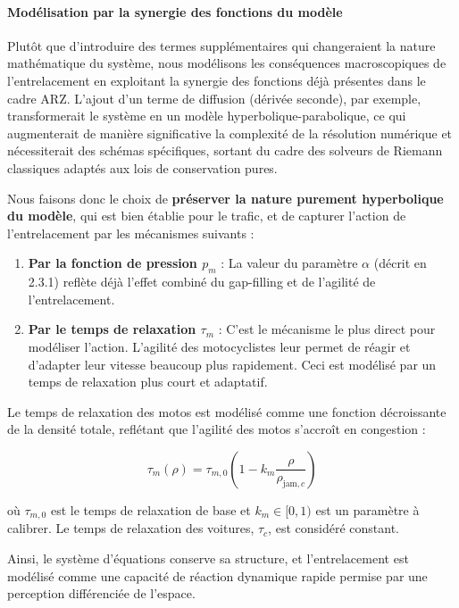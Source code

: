 \paragraph{Modélisation par la synergie des fonctions du modèle}
Plutôt que d'introduire des termes supplémentaires qui changeraient la nature mathématique du système, nous modélisons les conséquences macroscopiques de l'entrelacement en exploitant la synergie des fonctions déjà présentes dans le cadre ARZ. L'ajout d'un terme de diffusion (dérivée seconde), par exemple, transformerait le système en un modèle hyperbolique-parabolique, ce qui augmenterait de manière significative la complexité de la résolution numérique et nécessiterait des schémas spécifiques, sortant du cadre des solveurs de Riemann classiques adaptés aux lois de conservation pures.

Nous faisons donc le choix de \textbf{préserver la nature purement hyperbolique du modèle}, qui est bien établie pour le trafic, et de capturer l'action de l'entrelacement par les mécanismes suivants :
\begin{enumerate}
    \item \textbf{Par la fonction de pression $p_m$} : La valeur du paramètre $\alpha$ (décrit en 2.3.1) reflète déjà l'effet combiné du gap-filling et de l'agilité de l'entrelacement.
    \item \textbf{Par le temps de relaxation $\tau_m$} : C'est le mécanisme le plus direct pour modéliser l'action. L'agilité des motocyclistes leur permet de réagir et d'adapter leur vitesse beaucoup plus rapidement. Ceci est modélisé par un temps de relaxation plus court et adaptatif.
\end{enumerate}

Le temps de relaxation des motos est modélisé comme une fonction décroissante de la densité totale, reflétant que l'agilité des motos s'accroît en congestion :

\begin{equation}
\tau_m(\rho) = \tau_{m,0} \left(1 - k_m \frac{\rho}{\rho_{\text{jam},c}}\right)
\end{equation}

où $\tau_{m,0}$ est le temps de relaxation de base et $k_m \in [0,1)$ est un paramètre à calibrer. Le temps de relaxation des voitures, $\tau_c$, est considéré constant.

Ainsi, le système d'équations conserve sa structure, et l'entrelacement est modélisé comme une capacité de réaction dynamique rapide permise par une perception différenciée de l'espace.

